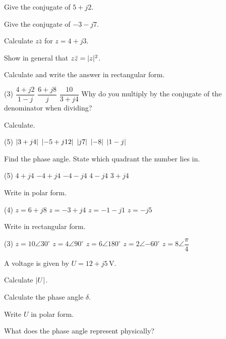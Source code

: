 \begin{parts}
  \item Give the conjugate of $5 + j2$.
  \item Give the conjugate of $-3 - j7$.
  \item Calculate $z\bar{z}$ for $z = 4 + j3$.
  \item Show in general that $z\bar{z} = \lvert z\rvert^2$.
\end{parts}

Calculate and write the answer in rectangular form.
\begin{delar}(3)
  \task $\dfrac{4 + j2}{1 - j}$
  \task $\dfrac{6 + j8}{j}$
  \task $\dfrac{10}{3 + j4}$
  \task* Why do you multiply by the conjugate of the denominator when dividing?
\end{delar}

Calculate.
\begin{delar}(5)
  \task $\lvert3 + j4\rvert$
  \task $\lvert-5 + j12\rvert$
  \task $\lvert j7\rvert$
  \task $\lvert-8\rvert$
  \task $\lvert1 - j\rvert$
\end{delar}

Find the phase angle. State which quadrant the number lies in.
\begin{delar}(5)
  \task $4 + j4$
  \task $-4 + j4$
  \task $-4 - j4$
  \task $4 - j4$
  \task $3 + j4$
\end{delar}

Write in polar form.
\begin{delar}(4)
  \task $z = 6 + j8$
  \task $z = -3 + j4$
  \task $z = -1 - j1$
  \task $z = -j5$
\end{delar}

Write in rectangular form.
\begin{delar}(3)
  \task $z = 10\angle 30^{\circ}$
  \task $z = 4\angle 90^{\circ}$
  \task $z = 6\angle 180^{\circ}$
  \task $z = 2\angle{-60^{\circ}}$
  \task $z = 8\angle\dfrac{\pi}{4}$
\end{delar}

A voltage is given by $U = 12 + j5\,\text{V}$.
\begin{parts}
  \item Calculate $\lvert U\rvert$.
  \item Calculate the phase angle $\delta$.
  \item Write $U$ in polar form.
  \item What does the phase angle represent physically?
\end{parts}

